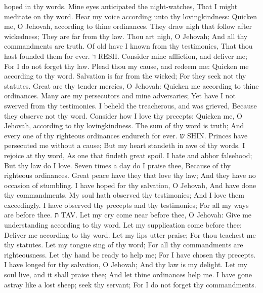 hoped in thy words.  Mine eyes anticipated the night-watches, That I might meditate on thy word.  Hear my voice according unto thy lovingkindness: Quicken me, O Jehovah, according to thine ordinances.  They draw nigh that follow after wickedness; They are far from thy law.  Thou art nigh, O Jehovah; And all thy commandments are truth.  Of old have I known from thy testimonies, That thou hast founded them for ever. ר RESH.  Consider mine affliction, and deliver me; For I do not forget thy law.  Plead thou my cause, and redeem me: Quicken me according to thy word.  Salvation is far from the wicked; For they seek not thy statutes.  Great are thy tender mercies, O Jehovah: Quicken me according to thine ordinances.  Many are my persecutors and mine adversaries; Yet have I not swerved from thy testimonies.  I beheld the treacherous, and was grieved, Because they observe not thy word.  Consider how I love thy precepts: Quicken me, O Jehovah, according to thy lovingkindness.  The sum of thy word is truth; And every one of thy righteous ordinances endureth for ever. ש SHIN.  Princes have persecuted me without a cause; But my heart standeth in awe of thy words.  I rejoice at thy word, As one that findeth great spoil.  I hate and abhor falsehood; But thy law do I love.  Seven times a day do I praise thee, Because of thy righteous ordinances.  Great peace have they that love thy law; And they have no occasion of stumbling.  I have hoped for thy salvation, O Jehovah, And have done thy commandments.  My soul hath observed thy testimonies; And I love them exceedingly.  I have observed thy precepts and thy testimonies; For all my ways are before thee. ת TAV.  Let my cry come near before thee, O Jehovah: Give me understanding according to thy word.  Let my supplication come before thee: Deliver me according to thy word.  Let my lips utter praise; For thou teachest me thy statutes.  Let my tongue sing of thy word; For all thy commandments are righteousness.  Let thy hand be ready to help me; For I have chosen thy precepts.  I have longed for thy salvation, O Jehovah; And thy law is my delight.  Let my soul live, and it shall praise thee; And let thine ordinances help me.  I have gone astray like a lost sheep; seek thy servant; For I do not forget thy commandments. 

